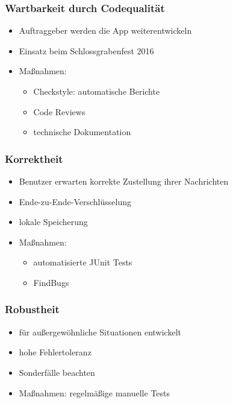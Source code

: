 \documentclass[accentcolor=tud4c,colorbacktitle]{tudbeamer}
\begin{document}
  \begin{frame}
    \frametitle{Wartbarkeit durch Codequalität}
    \begin{itemize}
      \item Auftraggeber werden die App weiterentwickeln
      \item Einsatz beim Schlossgrabenfest 2016
    \end{itemize}
    \begin{itemize}
      \item Maßnahmen:
        \begin{itemize}
          \item Checkstyle: automatische Berichte
          \item Code Reviews
          \item technische Dokumentation
        \end{itemize}
    \end{itemize}
  \end{frame}

  \begin{frame}
    \frametitle{Korrektheit}
    \begin{itemize}
      \item Benutzer erwarten korrekte Zustellung ihrer Nachrichten
      \item Ende-zu-Ende-Verschlüsselung
      \item lokale Speicherung
    \end{itemize}
    \begin{itemize}
      \item Maßnahmen:
        \begin{itemize}
          \item automatisierte JUnit Tests
          \item FindBugs
        \end{itemize}
    \end{itemize}
  \end{frame}

  \begin{frame}
    \frametitle{Robustheit}
    \begin{itemize}
      \item für außergewöhnliche Situationen entwickelt
      \item hohe Fehlertoleranz
      \item Sonderfälle beachten
    \end{itemize}
    \begin{itemize}
      \item Maßnahmen: regelmäßige manuelle Tests
    \end{itemize}
  \end{frame}
\end{document}
